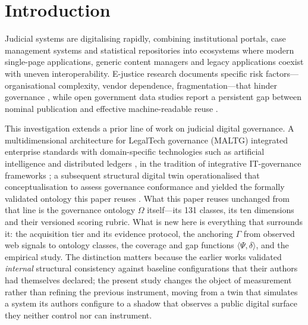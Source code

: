 \documentclass[engproc,proceedingpaper,submit,moreauthors]{Definitions/mdpi}
\begin{document}
\section{Introduction}
\label{sec:intro}
    Judicial systems are digitalising rapidly, combining institutional portals, case management systems and statistical repositories into ecosystems where modern single-page applications, generic content managers and legacy applications coexist with uneven interoperability. E-justice research documents specific risk factors---organisational complexity, vendor dependence, fragmentation---that hinder governance \cite{Rosa2013}, while open government data studies report a persistent gap between nominal publication and effective machine-readable reuse \cite{Janssen2012,Attard2015}.

    This investigation extends a prior line of work on judicial digital governance. A multidimensional architecture for LegalTech governance (MALTG) integrated enterprise standards with domain-specific technologies such as artificial intelligence and distributed ledgers \cite{paccha2026architecture}, in the tradition of integrative IT-governance frameworks \cite{DeHaes2013}; a subsequent structural digital twin operationalised that conceptualisation to assess governance conformance and yielded the formally validated ontology this paper reuses \cite{Paccha2026SDT}. What this paper reuses unchanged from that line is the governance ontology $\Omega$ itself---its 131 classes, its ten dimensions and their versioned scoring rubric. What is new here is everything that surrounds it: the acquisition tier and its evidence protocol, the anchoring $\Gamma$ from observed web signals to ontology classes, the coverage and gap functions $\langle\Psi,\delta\rangle$, and the empirical study. The distinction matters because the earlier works validated \emph{internal} structural consistency against baseline configurations that their authors had themselves declared; the present study changes the object of measurement rather than refining the previous instrument, moving from a twin that simulates a system its authors configure to a shadow that observes a public digital surface they neither control nor can instrument.
\end{document}
